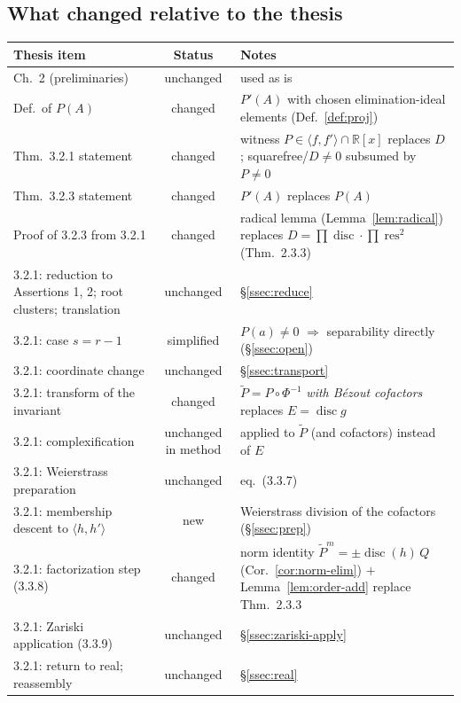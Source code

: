 \documentclass[11pt,a4paper]{article}
\theoremstyle{plain}
\theoremstyle{definition}
\newcommand{\R}{\mathbb{R}}
\DeclareMathOperator{\res}{res}
\DeclareMathOperator{\disc}{disc}
\newcommand{\ideal}[1]{\langle #1\rangle}
\begin{document}
\subsection{What changed relative to the thesis}

\begin{center}
\renewcommand{\arraystretch}{1.25}
\begin{tabular}{|p{5.4cm}|c|p{7.2cm}|}
\hline
\textbf{Thesis item} & \textbf{Status} & \textbf{Notes} \\
\hline
Ch.~2 (preliminaries) & unchanged & used as is \\
\hline
Def.\ of $P(A)$ & changed & $P'(A)$ with chosen elimination-ideal elements
(Def.~\ref{def:proj}) \\
\hline
Thm.~3.2.1 statement & changed & witness $P\in\ideal{f,f'}\cap\R[x]$ replaces
$D$; squarefree/$D\neq0$ subsumed by $P\neq 0$ \\
\hline
Thm.~3.2.3 statement & changed & $P'(A)$ replaces $P(A)$ \\
\hline
Proof of 3.2.3 from 3.2.1 & changed & radical lemma (Lemma~\ref{lem:radical})
replaces $D=\prod\disc\cdot\prod\res^2$ (Thm.~2.3.3) \\
\hline
3.2.1: reduction to Assertions 1, 2; root clusters; translation &
unchanged & \S\ref{ssec:reduce} \\
\hline
3.2.1: case $s=r-1$ & simplified & $P(a)\neq0$ $\Rightarrow$ separability
directly (\S\ref{ssec:open}) \\
\hline
3.2.1: coordinate change & unchanged & \S\ref{ssec:transport} \\
\hline
3.2.1: transform of the invariant & changed & $\widetilde P=P\circ\Phi^{-1}$
\emph{with B\'ezout cofactors} replaces $E=\disc g$ \\
\hline
3.2.1: complexification & unchanged in method & applied to $\widetilde P$
(and cofactors) instead of $E$ \\
\hline
3.2.1: Weierstrass preparation & unchanged & eq.~(3.3.7) \\
\hline
3.2.1: membership descent to $\ideal{h,h'}$ & new & Weierstrass division of
the cofactors (\S\ref{ssec:prep}) \\
\hline
3.2.1: factorization step (3.3.8) & changed & norm identity
$\widetilde P^{m}=\pm\disc(h)\,Q$ (Cor.~\ref{cor:norm-elim}) $+$
Lemma~\ref{lem:order-add} replace Thm.~2.3.3 \\
\hline
3.2.1: Zariski application (3.3.9) & unchanged & \S\ref{ssec:zariski-apply} \\
\hline
3.2.1: return to real; reassembly & unchanged & \S\ref{ssec:real} \\

\end{tabular}
\end{center}
\end{document}
